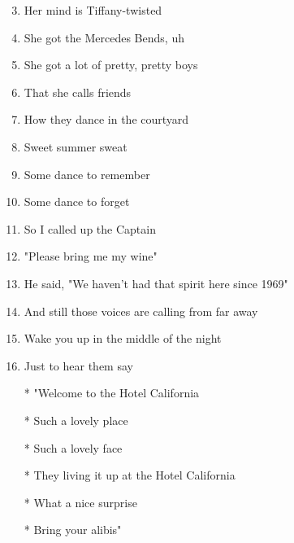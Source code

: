 \documentclass{article}
\begin{document}
\begin{center}
\begin{enumerate}
            \item[]
            \item[] 
            \item Her mind is Tiffany-twisted
            \item She got the Mercedes Bends, uh
            \item She got a lot of pretty, pretty boys
            \item That she calls friends
            \item How they dance in the courtyard
            \item Sweet summer sweat
            \item Some dance to remember
            \item Some dance to forget
            \item So I called up the Captain
            \item "Please bring me my wine"
            \item He said, "We haven't had that spirit here since 1969"
            \item And still those voices are calling from far away
            \item Wake you up in the middle of the night
            \item Just to hear them say
 
            \item[]
            \item[] \chorus
            \item[*] "Welcome to the Hotel California
            \item[*] Such a lovely place
            \item[*] Such a lovely face
            \item[*] They living it up at the Hotel California
            \item[*] What a nice surprise
            \item[*] Bring your alibis"
        

\end{enumerate}
\end{center}
\end{document}
